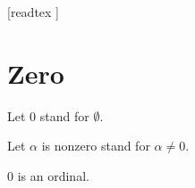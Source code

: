 \documentclass[10pt]{article}
\begin{document}
  \begin{imports}
    \begin{forthel}
      [readtex ]
    \end{forthel}
  \end{imports}


  \section*{Zero}

  \begin{forthel}
    Let $0$ stand for $\emptyset$.

    Let $\alpha$ is nonzero stand for $\alpha \neq 0$.
  \end{forthel}

  \begin{forthel}
    \begin{proposition}
      $0$ is an ordinal.
    \end{proposition}
  \end{forthel}
\end{document}
